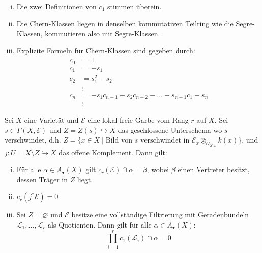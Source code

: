 \documentclass[10pt,a4paper]{article}
\begin{document}
\begin{remark}
\begin{enumerate}[(i)]
\item Die zwei Definitionen von $c_1$ stimmen überein.
\item Die Chern-Klassen liegen in denselben kommutativen Teilring wie die Segre-Klassen, kommutieren also mit Segre-Klassen.
\item Explizite Formeln für Chern-Klassen sind gegeben durch:
\begin{align*}
c_0 &= 1\\
c_1 &= -s_1\\
c_2 &= s_1^2 - s_2\\
&\vdots\\
c_n &= -s_1c_{n-1}-s_2c_{n-2}-\ldots -s_{n-1}c_1-s_n\\
&\vdots
\end{align*}
\end{enumerate}
\end{remark}

\begin{lemma}
Sei $X$ eine Varietät und $\mathcal{E}$ eine lokal freie Garbe vom Rang $r$ auf $X$. Sei $s\in\Gamma(X,\mathcal{E})$ und $Z=Z(s)\hookrightarrow X$ das geschlossene Unterschema wo $s$ verschwindet, d.h. $Z=\{x\in X\mid\text{Bild von $s$ verschwindet in $\mathcal{E}_x \otimes_{\mathcal{O}_{X,x}} k(x)$} \}$, und $j:U=X\setminus Z\hookrightarrow X$ das offene Komplement. Dann gilt:
\begin{enumerate}[(i)]
\item Für alle $\alpha\in A_\bullet(X)$ gilt $c_r(\mathcal{E})\cap\alpha = \beta$, wobei $\beta$ einen Vertreter besitzt, dessen Träger in $Z$ liegt.
\item $c_r(j^\ast\mathcal{E}) = 0$
\item Sei $Z=\varnothing$ und $\mathcal{E}$ besitze eine vollständige Filtrierung mit Geradenbündeln $\mathcal{L}_1,\ldots,\mathcal{L}_r$ als Quotienten. Dann gilt für alle $\alpha\in A_\bullet(X)$:
\[ \prod_{i=1}^r c_1(\mathcal{L}_i)\cap\alpha = 0 \]
\end{enumerate}
\end{lemma}
\end{document}
